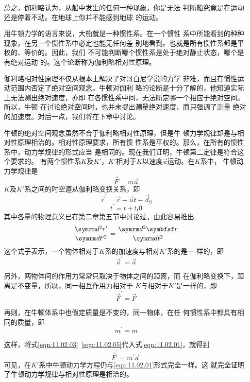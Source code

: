 总之，伽利略认为，从船中发生的任何一种现象，你是无法
判断船究竟是在运动还是停着不动。在地球上你并不能感到地球
的运动。

用牛顿力学的语言来说，大船就是一种惯性系。在一个惯性
系中所能看到的种种现象，在另一个惯性系中必定也能无任何差
别地看到。也就是所有惯性系都是平权的、等价的。因此，我们
不可能判断哪个惯性系是处于绝对静止状态，哪个是有绝对运动
的。这个论断称为伽利略相对性原理。

伽利略相对性原理不仅从根本上解决了对哥白尼学说的力学
非难，而且在惯性运动范围内否定了绝对空间观念。牛顿对伽利
略的论断是十分了解的，他知道实际上无法测出绝对速度，亦即
在各惯性系中间，无法断定哪一个相应于绝对空间。所以，牛顿
在讨论绝对空间时，也并未提出测量绝对速度，而只强调了测量
绝对的加速度。对后一点，我们将在下章中讨论。

牛顿的绝对空间观念虽然不合于伽利略相对性原理，但是牛
顿力学规律却是与相对性原理相治的。相对性原理要求，所有惯
性系是平权的。那么，在所有的惯性系中，动力学规律的形式应当
是相同的。现在我们证明，牛顿第二定律是符合这个要求的。
有两个惯性系$ K $及$ K' $，$ K' $相对于$ K $以速度$ \vec{u} $运动。在$ K $系中，
牛顿动力学规律是
\begin{equation}\label{eqn:11.02.01}
  \vec{F} = m \vec{a}
\end{equation}
$ K $及$ K' $系之间的时空遵从伽利略变换关系，即
\begin{equation}\label{eqn:11.02.02}
  \vec{r} ^ { \prime } = \vec{r} - \vec{u} t - \vec{d} _ { 0 }
\end{equation}
\begin{equation*}
  t ^ { \prime } = t + t _t { 0 }
\end{equation*}
其中各量的物理意义已在第二章第五节中讨论过，由此容易推出
\begin{equation*}
  \frac { \dif ^ { 2 } r ^ { \prime } } { \dif t ^ { \prime 2 } } = \frac { \dif ^ { 2 } \vec{r} } { \dif t ^ { 2 } }
\end{equation*}
这个式子表示，一个物体相对于$ K $系的加速度与相对$ K' $系的是一
样的，即
\begin{equation}\label{eqn:11.02.03}
  \vec{a} ^ { \prime } = \vec{a}
\end{equation}

另外，两物体间的作用力常常只取决于物体之间的距离，而
在伽利略变换下，距离是不变量，所以，同一相互作用力相对于
$ K $与相对于$ K' $是一样的，即
\begin{equation}\label{eqn:11.02.04}
  \vec{F} ^ { \prime } = \vec{F}
\end{equation}

再则，在牛顿体系中也假定质量是不变的，同一物体，在任
何惯性系中都具有相同的质量，即
\begin{equation}\label{eqn:11.02.05}
  m ^ { \prime } = m
\end{equation}

这样，将式\eqref{eqn:11.02.03}~\eqref{eqn:11.02.05}代入式\eqref{eqn:11.02.01}，就得到
\begin{equation}\label{eqn:11.02.06}
  \vec{F} ^ { \prime } = m ^ { \prime } \vec{a} ^ { \prime }
\end{equation}
可见，在$ K' $系中牛顿动力学方程仍与\eqref{eqn:11.02.01}形式完全一样。这
就完全证明了牛顿动力学规律与相对性原理是相洽的。
